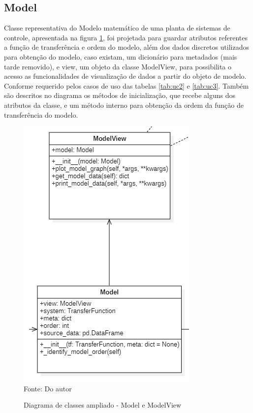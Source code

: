 \subsection{Model}

Classe representativa do Modelo matemático de uma planta de sistemas de controle, apresentada na figura
\ref{fig:class_diag_model}, foi projetada para guardar atributos
referentes a função de transferência e ordem do modelo, além dos dados discretos utilizados para obtenção do modelo,
caso existam, um dicionário para metadados (mais tarde removido), e view, um objeto da classe ModelView, para
possibilita o acesso as funcionalidades de visualização de dados a partir do objeto de modelo.
Conforme requerido pelos casos de uso das tabelas \ref{tab:uc2} e \ref{tab:uc3}.
Também são descritos no diagrama os métodos de inicialização, que recebe alguns dos atributos da classe, e um método
interno para obtenção da ordem da função de transferência do modelo.

\begin{figure}[H]
    \centering
    \caption{Diagrama de classes ampliado - Model e ModelView}
    \includegraphics[scale=0.7]{figuras/class_diag_model}
    \label{fig:class_diag_model}
    \\
    \vspace{0cm}\hspace{0cm}\small{Fonte: Do autor}
\end{figure}

